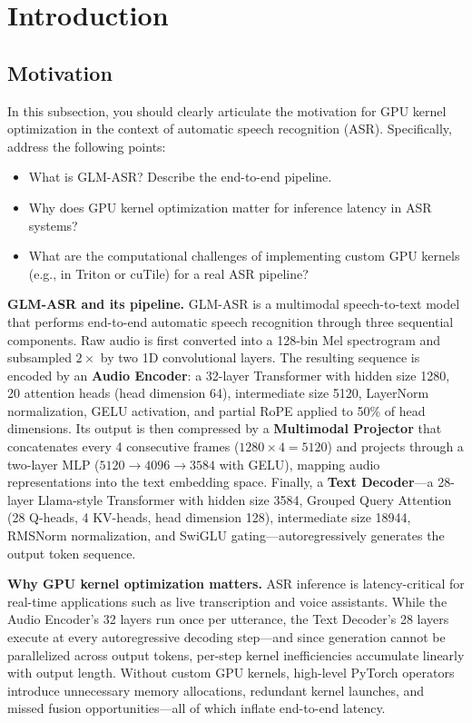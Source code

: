 \documentclass{article} %
\begin{document}
\section{Introduction}\label{sec:motivation}

\subsection{Motivation}

In this subsection, you should clearly articulate the motivation for GPU kernel optimization in the context of automatic speech recognition (ASR). Specifically, address the following points:
\begin{itemize}
    \item What is GLM-ASR? Describe the end-to-end pipeline.
    \item Why does GPU kernel optimization matter for inference latency in ASR systems?
    \item What are the computational challenges of implementing custom GPU kernels (e.g., in Triton or cuTile) for a real ASR pipeline?
\end{itemize}

\textbf{GLM-ASR and its pipeline.}
GLM-ASR is a multimodal speech-to-text model that performs end-to-end automatic speech recognition through three sequential components.
Raw audio is first converted into a 128-bin Mel spectrogram and subsampled $2{\times}$ by two 1D convolutional layers.
The resulting sequence is encoded by an \textbf{Audio Encoder}: a 32-layer Transformer with hidden size 1280, 20 attention heads (head dimension 64), intermediate size 5120, LayerNorm normalization, GELU activation, and partial RoPE applied to 50\% of head dimensions.
Its output is then compressed by a \textbf{Multimodal Projector} that concatenates every 4 consecutive frames ($1280{\times}4 = 5120$) and projects through a two-layer MLP ($5120{\to}4096{\to}3584$ with GELU), mapping audio representations into the text embedding space.
Finally, a \textbf{Text Decoder}---a 28-layer Llama-style Transformer with hidden size 3584, Grouped Query Attention (28 Q-heads, 4 KV-heads, head dimension 128), intermediate size 18944, RMSNorm normalization, and SwiGLU gating---autoregressively generates the output token sequence.

\textbf{Why GPU kernel optimization matters.}
ASR inference is latency-critical for real-time applications such as live transcription and voice assistants.
While the Audio Encoder's 32 layers run once per utterance, the Text Decoder's 28 layers execute at every autoregressive decoding step---and since generation cannot be parallelized across output tokens, per-step kernel inefficiencies accumulate linearly with output length.
Without custom GPU kernels, high-level PyTorch operators introduce unnecessary memory allocations, redundant kernel launches, and missed fusion opportunities---all of which inflate end-to-end latency.
\end{document}
